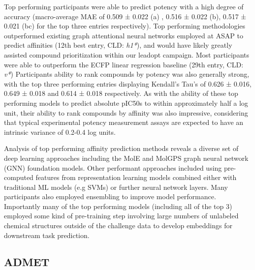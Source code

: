\documentclass[journal=jcim,manuscript=article]{achemso}
\begin{document}
Top performing participants were able to predict potency with a high degree of accuracy (macro-average MAE of 0.509 ± 0.022 (a)
, 0.516 ± 0.022 (b), 0.517 ± 0.021 (bc) for the top three entries respectively). Top performing methodologies outperformed existing graph attentional neural networks employed at ASAP to predict affinities (12th best entry, CLD: \textit{h1*}), and would have likely greatly assisted compound prioritization within our leadopt campaign. Most participants were able to outperform the ECFP linear regression baseline (29th entry, CLD: \textit{v*}) Participants ability to rank compounds by potency was also generally strong, with the top three performing entries displaying Kendall's Tau's of 0.626 ± 0.016, 0.649 ± 0.018 and 0.614 ± 0.018 respectively. As with the ability of these top performing models to predict absolute pIC50s to within approximately half a log unit, their ability to rank compounds by affinity was also impressive, considering that typical experimental potency measurement assays are expected to have an intrinsic variance of 0.2-0.4 log units.

Analysis of top performing affinity prediction methods reveals a diverse set of deep learning approaches including the MolE and MolGPS graph neural network (GNN) foundation models. Other performant approaches included using pre-computed features from representation learning models combined either with traditional ML models (e.g SVMs) or further neural network layers. Many participants also employed ensembling to improve model performance.  Importantly many of the top performing models (including all of the top 3) employed some kind of pre-training step involving large numbers of unlabeled chemical structures outside of the challenge data to develop embeddings for downstream task prediction.


\subsection{ADMET}
\end{document}
